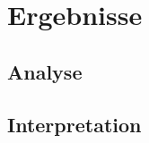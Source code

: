 \section{Ergebnisse}
\blindtext[1]
\subsection{Analyse}
\blindtext[1]
\subsection{Interpretation}
\blindtext[1]
